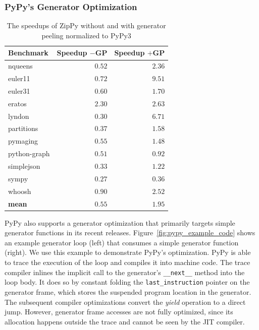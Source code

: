 \subsubsection{PyPy's Generator Optimization}

\begin{table}
  \begin{center}
  \begin{tabular}{ l r r }
  \toprule
  Benchmark             & Speedup $-$GP & Speedup $+$GP \\
  \midrule
  \textsf{nqueens}      & $0.52$ & $2.36$ \\
  \textsf{euler11}      & $0.72$ & $9.51$ \\
  \textsf{euler31}      & $0.60$ & $1.70$ \\
  \textsf{eratos}       & $2.30$ & $2.63$ \\
  \textsf{lyndon}       & $0.30$ & $6.71$ \\
  \textsf{partitions}   & $0.37$ & $1.58$ \\
  \textsf{pymaging}     & $0.55$ & $1.48$ \\
  \textsf{python-graph} & $0.51$ & $0.92$ \\
  \textsf{simplejson}   & $0.33$ & $1.22$ \\
  \textsf{sympy}        & $0.27$ & $0.36$ \\
  \textsf{whoosh}       & $0.90$ & $2.52$ \\
  \textbf{mean}         & \textbf{$0.55$} & \textbf{$1.95$} \\
  \bottomrule
  \end{tabular}
  \caption{The speedups of ZipPy without and with generator peeling normalized to PyPy3}
  \label{tab:ch6-generator-benchmarks-zippy-vs-pypy}
  \end{center}
\end{table}

PyPy also supports a generator optimization that primarily targets simple generator functions in its recent releases.
Figure~\ref{fig:pypy_example_code} shows an example generator loop (left) that consumes a simple generator function (right).
We use this example to demonstrate PyPy's optimization.
PyPy is able to trace the execution of the loop and compiles it into machine code.
The trace compiler inlines the implicit call to the generator's \texttt{\_\_next\_\_} method into the loop body.
It does so by constant folding the \texttt{last\_instruction} pointer on the generator frame, which stores the suspended program location in the generator.
The subsequent compiler optimizations convert the \emph{yield} operation to a direct jump.
However, generator frame accesses are not fully optimized, since its allocation happens outside the trace and cannot be seen by the JIT compiler.

